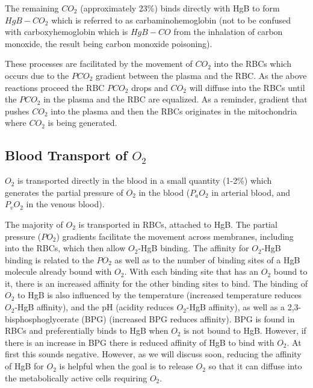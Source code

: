 
The remaining $CO_2$ (approximately 23\%) binds directly with HgB to form $HgB-CO_2$ which is referred to as carbaminohemoglobin (not to be confused with carboxyhemoglobin which is $HgB-CO$ from the inhalation of carbon monoxide, the result being carbon monoxide poisoning). 

These processes are facilitated by the movement of $CO_2$ into the RBCs which occurs due to the $PCO_2$ gradient between the plasma and the RBC. As the above reactions proceed the RBC $PCO_2$ drops and $CO_2$ will diffuse into the RBCs until the $PCO_2$ in the plasma and the RBC are equalized. As a reminder, gradient that pushes $CO_2$ into the plasma and then the RBCs originates in the mitochondria where $CO_2$ is being generated.


\subsection{Blood Transport of $O_2$}

$O_2$ is transported directly in the blood in a small quantity (1-2\%) which generates the partial pressure of $O_2$ in the blood ($P_aO_2$ in arterial blood, and $P_vO_2$ in the venous blood). 

The majority of $O_2$ is transported in RBCs, attached to HgB. The partial pressure ($PO_2$) gradients facilitate the movement across membranes, including into the RBCs, which then allow $O_2$-HgB binding. The affinity for $O_2$-HgB binding is related to the $PO_2$ as well as to the number of binding sites of a HgB molecule already bound with $O_2$. With each binding site that has an $O_2$ bound to it, there is an increased affinity for the other binding sites to bind. The binding of $O_2$ to HgB is also influenced by the temperature (increased temperature reduces $O_2$-HgB affinity), and the pH (acidity reduces $O_2$-HgB affinity), as well as a 2,3-bisphosphoglycerate (BPG) (increased BPG reduces affinity). BPG is found in RBCs and preferentially binds to HgB when $O_2$ is not bound to HgB. However, if there is an increase in BPG there is reduced affinity of HgB to bind with $O_2$. At first this sounds negative. However, as we will discuss soon, reducing the affinity of HgB for $O_2$ is helpful when the goal is to release $O_2$ so that it can diffuse into the metabolically active cells requiring $O_2$.

